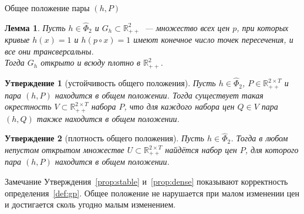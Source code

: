 \documentclass[10pt,aspectratio=169]{beamer}
\theoremstyle{plain}
\newtheorem{lem}{Лемма}
\newtheorem{prop}{Утверждение}
\theoremstyle{definition}
\newcommand{\R}{\mathbb{R}}
\newcommand{\Rpp}[1][2]{\R^{#1}_{++}}
\newcommand{\PhiHat}{\hat{\Phi}}
\begin{document}
\begin{frame}{Общее положение пары $(h,P)$}
    \begin{lem}\label{lem:finite}
        Пусть $h\in\PhiHat_2$ и $G_h\subset\Rpp$~--- множество всех цен $p$, при которых кривые $h(x)=1$ и $h(p\circ x)=1$ имеют конечное число точек пересечения, и все они трансверсальны.\\
        Тогда $G_h$ открыто и всюду плотно в $\Rpp$.
    \end{lem}

    \begin{prop}[устойчивость общего положения]
        Пусть $h\in\PhiHat_2$, $P\in\Rpp[2\times T]$ и пара $(h,P)$ находится в общем положении. Тогда существует такая окрестность $V\subset\Rpp[2\times T]$ набора $P$, что для каждого набора цен $Q\in V$ пара $(h,Q)$ также находится в общем положении.
    \end{prop}

    \begin{prop}[плотность общего положения]
        Пусть $h\in\PhiHat_2$. Тогда в любом непустом открытом множестве $U\subset\Rpp[2\times T]$ найдётся набор цен $P$, для которого пара $(h,P)$ находится в общем положении.
    \end{prop}

    \begin{block}{Замечание}
        Утверждения~\ref{prop:stable} и~\ref{prop:dense} показывают корректность определения~\ref{def:gp}. Общее положение не нарушается при малом изменении цен и достигается сколь угодно малым изменением.
    \end{block}
\end{frame}
\end{document}
